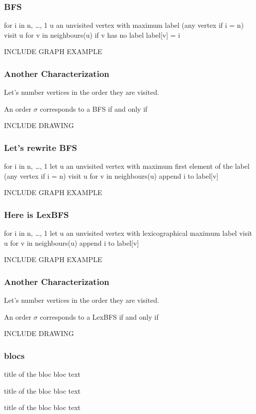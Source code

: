\documentclass{beamer}
\begin{document}
\begin{frame}\frametitle{BFS}
    \begin{definition}
    for i in {n, …, 1}
	u an unvisited vertex with maximum label (any vertex if i = n)
	visit u
	for v in neighbours(u)
	   if v has no label
	       label[v] = i
    \end{definition}
    INCLUDE GRAPH EXAMPLE
\end{frame}

\begin{frame}\frametitle{Another Characterization}
    Let's number vertices in the order they are visited.
    \begin{theorem}
       An order $\sigma$ corresponds to a BFS if and only if
    \end{theorem}
    INCLUDE DRAWING
\end{frame}

\begin{frame}\frametitle{Let's rewrite BFS}
    \begin{definition}
    for i in {n, …, 1}
	let u an unvisited vertex with maximum first element of the label (any vertex if i = n)
	visit u
	for v in neighbours(u)
	   append i to label[v]
    \end{definition}
    INCLUDE GRAPH EXAMPLE
\end{frame}

\begin{frame}\frametitle{Here is LexBFS}
    \begin{definition}
    for i in {n, …, 1}
	let u an unvisited vertex with lexicographical maximum label
	visit u
	for v in neighbours(u)
	   append i to label[v]
    \end{definition}
    INCLUDE GRAPH EXAMPLE
\end{frame}

\begin{frame}\frametitle{Another Characterization}
    Let's number vertices in the order they are visited.
    \begin{theorem}
       An order $\sigma$ corresponds to a LexBFS if and only if
    \end{theorem}
    INCLUDE DRAWING
\end{frame}

\begin{frame}\frametitle{blocs}

\begin{block}{title of the bloc}
bloc text
\end{block}

\begin{exampleblock}{title of the bloc}
bloc text
\end{exampleblock}


\begin{alertblock}{title of the bloc}
bloc text
\end{alertblock}
\end{frame}
\end{document}
